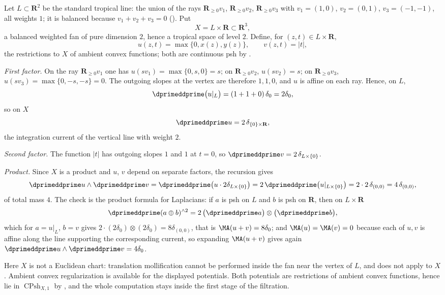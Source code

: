 \begin{example}
\label{ex:ch16-fan-product}
Let $L\subset\mathbf R^2$ be the standard tropical line: the union of the
rays $\mathbf R_{\geq0}v_1$, $\mathbf R_{\geq0}v_2$,
$\mathbf R_{\geq0}v_3$ with $v_1=(1,0)$, $v_2=(0,1)$, $v_3=(-1,-1)$, all
weights $1$; it is balanced because $v_1+v_2+v_3=0$
().  Put
\[
 X=L\times\mathbf R\subset\mathbf R^3,
\]
a balanced weighted fan of pure dimension $2$, hence a tropical space of
level $2$.  Define, for $(z,t)\in L\times\mathbf R$,
\[
 u(z,t)=\max\{0,x(z),y(z)\},
 \qquad
 v(z,t)=|t| ,
\]
the restrictions to $X$ of ambient convex functions; both are continuous psh
by .

\emph{First factor.}  On the ray $\mathbf R_{\geq0}v_1$ one has
$u(sv_1)=\max\{0,s,0\}=s$; on $\mathbf R_{\geq0}v_2$, $u(sv_2)=s$; on
$\mathbf R_{\geq0}v_3$, $u(sv_3)=\max\{0,-s,-s\}=0$.  The outgoing slopes at
the vertex are therefore $1,1,0$, and $u$ is affine on each ray.  Hence, on
$L$,
\[
 \dprimeddprime\bigl(u|_L\bigr)=(1+1+0)\,\delta_0=2\delta_0 ,
\]
so on $X$
\[
 \dprimeddprime u=2\,\delta_{\{0\}\times\mathbf R},
\]
the integration current of the vertical line with weight $2$.

\emph{Second factor.}  The function $|t|$ has outgoing slopes $1$ and $1$ at
$t=0$, so $\dprimeddprime v=2\,\delta_{L\times\{0\}}$.

\emph{Product.}  Since $X$ is a product and $u$, $v$ depend on separate
factors, the recursion gives
\[
 \dprimeddprime u\wedge\dprimeddprime v
 =\dprimeddprime\bigl(u\cdot2\delta_{L\times\{0\}}\bigr)
 =2\,\dprimeddprime\bigl(u|_{L\times\{0\}}\bigr)
 =2\cdot2\,\delta_{(0,0)}
 =4\,\delta_{(0,0)},
\]
of total mass $4$.  The check is the product formula for Laplacians: if
$a$ is psh on $L$ and $b$ is psh on $\mathbf R$, then on $L\times\mathbf R$
\[
 \dprimeddprime(a\oplus b)^{\wedge2}
 =2\,\bigl(\dprimeddprime a\bigr)\otimes\bigl(\dprimeddprime b\bigr),
\]
which for $a=u|_L$, $b=v$ gives $2\cdot(2\delta_0)\otimes(2\delta_0)
=8\delta_{(0,0)}$, that is $\MA(u+v)=8\delta_0$; and
$\MA(u)=\MA(v)=0$ because each of $u,v$ is affine along the line supporting
the corresponding current, so expanding $\MA(u+v)$ gives again
$\dprimeddprime u\wedge\dprimeddprime v=4\delta_0$.

Here $X$ is not a Euclidean chart: translation mollification cannot be
performed inside the fan near the vertex of $L$, and
 does not apply to $X$.  Ambient
convex regularization is available for the displayed potentials.  Both
potentials are restrictions of ambient convex functions, hence lie in
$\operatorname{CPsh}_{X,1}$ by
, and the whole computation stays inside
the first stage of the filtration.
\end{example}


